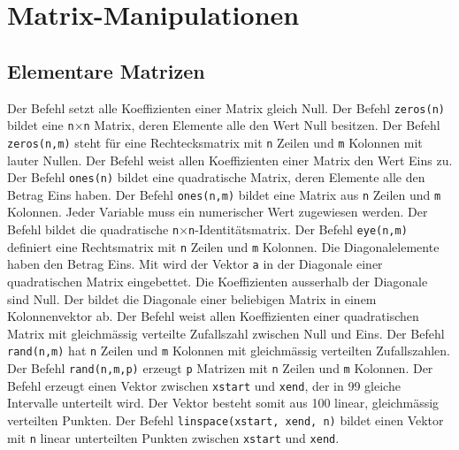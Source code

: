 \section{Matrix-Manipulationen}
\subsection{Elementare Matrizen}
Der Befehl  setzt alle Koeffizienten einer Matrix gleich Null. Der Befehl {\color{red}\texttt{zeros(n)}} bildet eine \texttt{n$\times$n} Matrix, deren Elemente alle den Wert Null besitzen. Der Befehl {\color{red}\texttt{zeros(n,m)}} steht für eine Rechtecksmatrix mit \texttt{n} Zeilen und \texttt{m} Kolonnen mit lauter Nullen.
\newline\newline
Der Befehl  weist allen Koeffizienten einer Matrix den Wert Eins zu. Der Befehl {\color{red}\texttt{ones(n)}} bildet eine quadratische Matrix, deren Elemente alle den Betrag Eins haben. Der Befehl {\color{red}\texttt{ones(n,m)}} bildet eine Matrix aus \texttt{n} Zeilen und \texttt{m} Kolonnen. Jeder Variable muss ein numerischer Wert zugewiesen werden.
\newline\newline
Der Befehl  bildet die quadratische \texttt{n$\times$n}-Identitätsmatrix. Der Befehl {\color{red}\texttt{eye(n,m)}} definiert eine Rechtsmatrix mit \texttt{n} Zeilen und \texttt{m} Kolonnen. Die Diagonalelemente haben den Betrag Eins. 
\newline\newline
Mit  wird der Vektor \texttt{a} in der Diagonale einer quadratischen Matrix eingebettet. Die Koeffizienten ausserhalb der Diagonale sind Null. Der  bildet die Diagonale einer beliebigen Matrix in einem Kolonnenvektor ab. 
\newline\newline
Der Befehl  weist allen Koeffizienten einer quadratischen Matrix mit gleichmässig verteilte Zufallszahl zwischen Null und Eins. Der Befehl {\color{red}\texttt{rand(n,m)}} hat \texttt{n} Zeilen und \texttt{m} Kolonnen mit gleichmässig verteilten Zufallszahlen. Der Befehl {\color{red}\texttt{rand(n,m,p)}} erzeugt \texttt{p} Matrizen mit \texttt{n} Zeilen und \texttt{m} Kolonnen. 
\newline\newline
Der Befehl  erzeugt einen Vektor zwischen \texttt{xstart} und \texttt{xend}, der in 99 gleiche Intervalle unterteilt wird. Der Vektor besteht somit aus 100 linear, gleichmässig verteilten Punkten. Der Befehl {\color{red}\texttt{linspace(xstart, xend, n)}} bildet einen Vektor mit \texttt{n} linear unterteilten Punkten zwischen \texttt{xstart} und \texttt{xend}.
